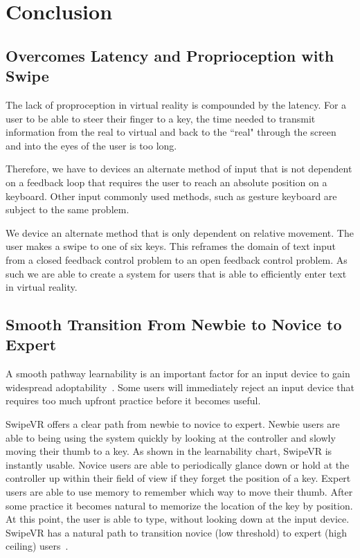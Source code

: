 \documentclass{sigchi}
\begin{document}
\section{Conclusion}

\subsection{Overcomes Latency and Proprioception with Swipe}
The lack of proproception in virtual reality is compounded by the latency.
For a user to be able to steer their finger to a key, the time needed to transmit information from the real to virtual and back to the ``real" through the  screen and into the eyes of the user is too long.

Therefore, we have to devices an alternate method of input that is not dependent on a feedback loop that requires the user to reach an absolute position on a keyboard.
Other input commonly used methods, such as gesture keyboard are subject to the same problem.

We device an alternate method that is only dependent on relative movement.
The user makes a swipe to one of six keys.
This reframes the domain of text input from a closed  feedback control problem to an open feedback control problem.
As such we are able to create a system for users that is able to efficiently enter text in virtual reality.


\subsection{Smooth Transition From Newbie to Novice to Expert }

A smooth pathway learnability is an important factor for an input device to gain widespread adoptability~\cite{}.
Some users will immediately reject an input device that requires too much upfront practice before it becomes useful.

SwipeVR offers a clear path from newbie to novice to expert. Newbie users are able to being using the system quickly by looking at the controller and slowly moving their thumb to a key.
As shown in the learnability chart, SwipeVR is instantly usable.
Novice users are able to periodically glance down or hold at the controller up within their field of view if they forget the position of a key.
Expert users are able to use memory to remember which way to move their thumb.
After some practice it becomes natural to memorize the location of the key by position.
At this point, the user is able to type, without looking down at the input device.
SwipeVR has a natural path to transition novice (low threshold) to expert (high ceiling) users~\cite{grover2013computational}.
\end{document}
